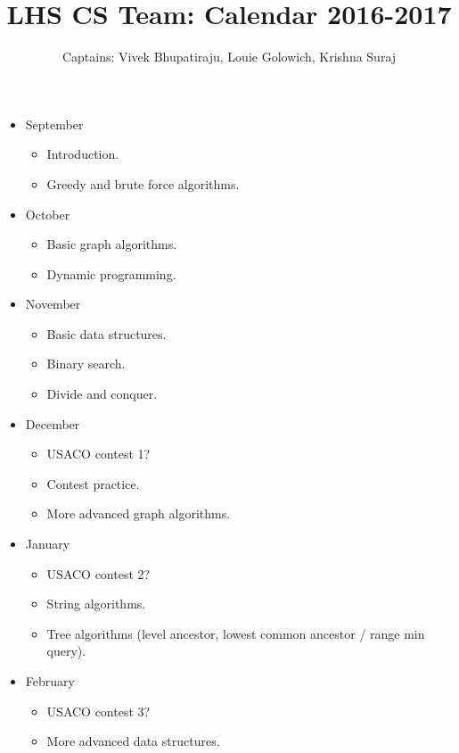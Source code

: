 \documentclass[11pt, oneside]{article}   	%
\title{LHS CS Team: Calendar 2016-2017}
\author{Captains: Vivek Bhupatiraju, Louie Golowich, Krishna Suraj}
\begin{document}
\maketitle

\begin{itemize}
\item September
\begin{itemize}
\item Introduction.
\item Greedy and brute force algorithms.
\end{itemize}

\item October
\begin{itemize}
\item Basic graph algorithms.
\item Dynamic programming.
\end{itemize}

\item November
\begin{itemize}
\item Basic data structures.
\item Binary search.
\item Divide and conquer.
\end{itemize}

\item December
\begin{itemize}
\item USACO contest 1?
\item Contest practice.
\item More advanced graph algorithms.
\end{itemize}

\item January
\begin{itemize}
\item USACO contest 2?
\item String algorithms.
\item Tree algorithms (level ancestor, lowest common ancestor / range min query).
\end{itemize}

\item February
\begin{itemize}
\item USACO contest 3?
\item More advanced data structures.
\end{itemize}


\end{itemize}
\end{document}
